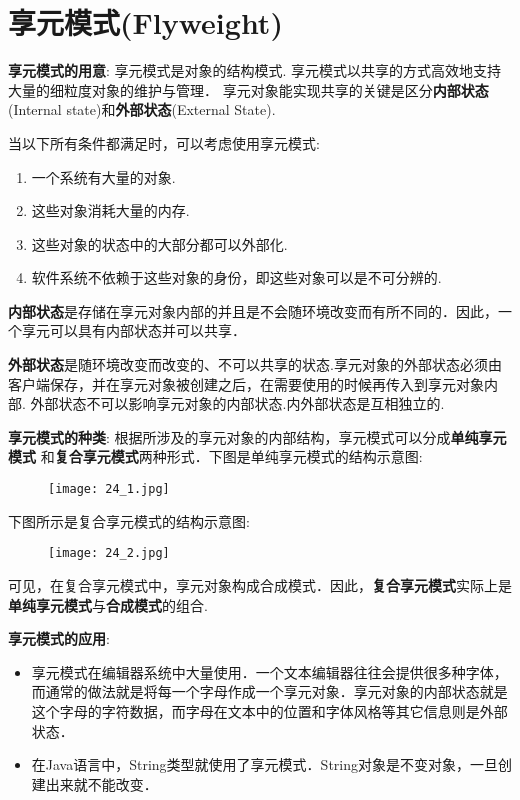 \documentclass[../main.tex]{subfiles}
\begin{document}
\section{享元模式(Flyweight)}
\textbf{享元模式的用意}:
享元模式是对象的结构模式. 享元模式以共享的方式高效地支持大量的细粒度对象的维护与管理．
享元对象能实现共享的关键是区分\textbf{内部状态}(Internal  state)和\textbf{外部状态}(External State).

当以下所有条件都满足时，可以考虑使用享元模式:
\begin{enumerate}
  \item 一个系统有大量的对象.
  \item 这些对象消耗大量的内存.
  \item 这些对象的状态中的大部分都可以外部化.
  \item 软件系统不依赖于这些对象的身份，即这些对象可以是不可分辨的.
\end{enumerate}
%
\textbf{内部状态}是存储在享元对象内部的并且是不会随环境改变而有所不同的．因此，一个享元可以具有内部状态并可以共享．

\textbf{外部状态}是随环境改变而改变的、不可以共享的状态.享元对象的外部状态必须由客户端保存，并在享元对象被创建之后，在需要使用的时候再传入到享元对象内部.
外部状态不可以影响享元对象的内部状态.内外部状态是互相独立的.

\textbf{享元模式的种类}:
根据所涉及的享元对象的内部结构，享元模式可以分成\textbf{单纯享元模式}
和\textbf{复合享元模式}两种形式．下图是单纯享元模式的结构示意图:
%
\begin{figure}[H]
  \texttt{[image: 24\_1.jpg]}
\end{figure}
%
下图所示是复合享元模式的结构示意图:
%
\begin{figure}[H]
  \texttt{[image: 24\_2.jpg]}
\end{figure}
%
可见，在复合享元模式中，享元对象构成合成模式．因此，\textbf{复合享元模式}实际上是\textbf{单纯享元模式}与\textbf{合成模式}的组合.

\textbf{享元模式的应用}:
\begin{itemize}
  \item 享元模式在编辑器系统中大量使用．一个文本编辑器往往会提供很多种字体，而通常的做法就是将每一个字母作成一个享元对象．享元对象的内部状态就是这个字母的字符数据，而字母在文本中的位置和字体风格等其它信息则是外部状态．
  \item 在Java语言中，String类型就使用了享元模式．String对象是不变对象，一旦创建出来就不能改变．
\end{itemize}
%
\end{document}
